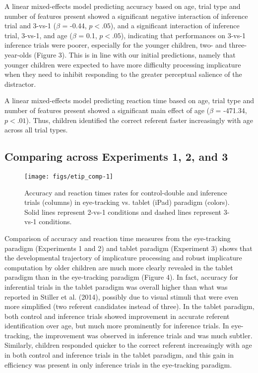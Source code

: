 \documentclass[a4paper,man,apacite,floatsintext]{apa6}
\newenvironment{CodeChunk}{}{}
\begin{document}
A linear mixed-effects model predicting accuracy based on age, trial
type and number of features present showed a significant negative
interaction of inference trial and 3-vs-1 (\(\beta\) = -0.44,
\(p <.05\)), and a significant interaction of inference trial, 3-vs-1,
and age (\(\beta\) = 0.1, \(p <.05\)), indicating that performances on
3-vs-1 inference trials were poorer, especially for the younger
children, two- and three-year-olds (Figure 3). This is in line with our
initial predictions, namely that younger children were expected to have
more difficulty processing implicature when they need to inhibit
responding to the greater perceptual salience of the distractor.

A linear mixed-effects model predicting reaction time based on age,
trial type and number of features present showed a significant main
effect of age (\(\beta\) = -471.34, \(p < .01\)). Thus, children
identified the correct referent faster increasingly with age across all
trial types.

\subsection{Comparing across Experiments 1, 2, and
3}\label{comparing-across-experiments-1-2-and-3}

\begin{CodeChunk}
\begin{figure}[H]

{\centering \texttt{[image: figs/etip\_comp-1]} 

}

\caption[Accuracy and reaction times rates for control-double and inference trials (columns) in eye-tracking vs]{Accuracy and reaction times rates for control-double and inference trials (columns) in eye-tracking vs. tablet (iPad) paradigm (colors). Solid lines represent 2-vs-1 conditions and dashed lines represent 3-vs-1 conditions.}\label{fig:etip_comp}
\end{figure}
\end{CodeChunk}

Comparison of accuracy and reaction time measures from the eye-tracking
paradigm (Experiments 1 and 2) and tablet paradigm (Experiment 3) shows
that the developmental trajectory of implicature processing and robust
implicature computation by older children are much more clearly revealed
in the tablet paradigm than in the eye-tracking paradigm (Figure 4). In
fact, accuracy for inferential trials in the tablet paradigm was overall
higher than what was reported in Stiller et al. (2014), possibly due to
visual stimuli that were even more simplified (two referent candidates
instead of three). In the tablet paradigm, both control and inference
trials showed improvement in accurate referent identification over age,
but much more prominently for inference trials. In eye-tracking, the
improvement was observed in inference trials and was much subtler.
Similarly, children responded quicker to the correct referent
increasingly with age in both control and inference trials in the tablet
paradigm, and this gain in efficiency was present in only inference
trials in the eye-tracking paradigm.
\end{document}
